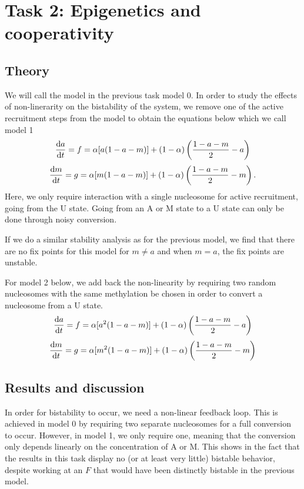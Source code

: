 \documentclass[fleqn,10pt]{SelfArx} %
\begin{document}
\section{Task 2: Epigenetics and cooperativity}
\subsection{Theory}
We will call the model in the previous task model 0. In order to study the effects of non-linerarity on the bistability of the system, we remove one of the active recruitment steps from the model to obtain the equations below which we call 
model 1
\begin{equation}
	\dv {a}{t} = f = \alpha[a(1-a-m)] + (1-\alpha )\left(\frac{1-a-m}{2}  - a\right)
\end{equation}
\begin{equation}
	\dv {m}{t} = g = \alpha[m(1-a-m)] + (1-\alpha )\left(\frac{1-a-m}{2}  - m\right).
\end{equation}
Here, we only require interaction with a single nucleosome for active recruitment, going from the U state. Going from an A or M state to a U state can only be done through noisy conversion. 

If we do a similar stability analysis as for the previous model, we find that there are no fix points for this model for $m\neq a$ and when $m=a$, the fix points are unstable. 


For model 2 below, we add back the non-linearity by requiring two random nucleosomes with the same methylation be chosen in order to convert a nucleosome from a U state. 
\begin{equation}
	\dv {a}{t} = f = \alpha[a^2(1-a-m)] + (1-\alpha )\left(\frac{1-a-m}{2}  - a\right)
\end{equation}
\begin{equation}
	\dv {m}{t} = g = \alpha[m^2(1-a-m)] + (1-\alpha )\left(\frac{1-a-m}{2}  - m\right)
\end{equation}


\subsection{Results and discussion}
In order for bistability to occur, we need a non-linear feedback loop. This is achieved in model 0 by requiring two separate nucleosomes for a full conversion to occur. However, in model 1, we only require one, meaning that the conversion only depends linearly on the concentration of A or M. This shows in the fact that the results in this task display no (or at least very little) bistable behavior, despite working at an $F$ that would have been distinctly bistable in the previous model. 
\end{document}
